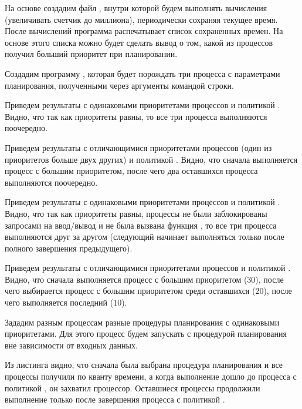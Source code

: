 На основе  создадим файл , внутри которой будем выполнять вычисления (увеличивать счетчик до миллиона), периодически сохраняя текущее время. После вычислений программа распечатывает список сохраненных времен. На основе этого списка можно будет сделать вывод о том, какой из процессов получил больший приоритет при планировании. 



Создадим программу , которая будет порождать три процесса  с параметрами планирования, полученными через аргументы командой строки. 



Приведем результаты с одинаковыми приоритетами процессов и политикой . Видно, что так как приоритеты равны, то все три процесса выполняются поочередно.


Приведем результаты с отличающимися приоритетами процессов (один из приоритетов больше двух других) и политикой . Видно, что сначала выполняется процесс с большим приоритетом, после чего два оставшихся процесса выполняются поочередно.


Приведем результаты с одинаковыми приоритетами процессов и политикой . Видно, что так как приоритеты равны, процессы не были заблокированы запросами на ввод/вывод и не была вызвана функция , то все три процесса выполняются друг за другом (следующий начинает выполняться только после полного завершения предыдущего).


Приведем результаты с отличающимися приоритетами процессов и политикой . Видно, что сначала выполняется процесс с большим приоритетом (30), после чего выбирается процесс с большим приоритетом среди оставшихся (20), после чего выполняется последний (10).


Зададим разным процессам разные процедуры планирования с одинаковыми приоритетами. Для этого процесс  будем запускать с процедурой планирования  вне зависимости от входных данных.

Из листинга видно, что сначала была выбрана процедура планирования  и все процессы получили по кванту времени, а когда выполнение дошло до процесса с политикой , он захватил процессор. Оставшиеся процессы продолжили выполнение только после завершения процесса с политикой .

